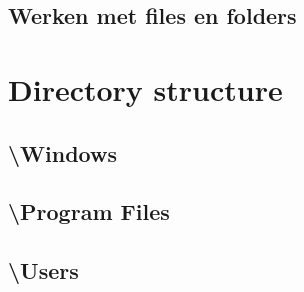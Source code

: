 \documentclass[a4paper,12pt,twoside,titlepage]{article}
\begin{document}
\subsection{Werken met files en folders}


\section{Directory structure}

\subsection{\textbackslash Windows}

\subsection{\textbackslash Program Files}

\subsection{\textbackslash Users}


\printindex
\end{document}
